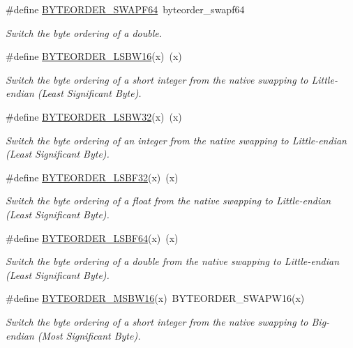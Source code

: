 \begin{DoxyCompactItemize}
\#define \hyperlink{group__byteorder_ga9e36111d85cc708026b869111af4d084}{BYTEORDER\_\-SWAPF64}~byteorder\_\-swapf64
\begin{DoxyCompactList}\small\item\em Switch the byte ordering of a double. \item\end{DoxyCompactList}\item 
\#define \hyperlink{group__byteorder_gaa46359f7d1f29bab74afddacd9decdeb}{BYTEORDER\_\-LSBW16}(x)~(x)
\begin{DoxyCompactList}\small\item\em Switch the byte ordering of a short integer from the native swapping to Little-\/endian (Least Significant Byte). \item\end{DoxyCompactList}\item 
\#define \hyperlink{group__byteorder_ga24bb3ddfe733a3202d53a0d14f186105}{BYTEORDER\_\-LSBW32}(x)~(x)
\begin{DoxyCompactList}\small\item\em Switch the byte ordering of an integer from the native swapping to Little-\/endian (Least Significant Byte). \item\end{DoxyCompactList}\item 
\#define \hyperlink{group__byteorder_gae8ff7d2f1611389be2d908c8675e344a}{BYTEORDER\_\-LSBF32}(x)~(x)
\begin{DoxyCompactList}\small\item\em Switch the byte ordering of a float from the native swapping to Little-\/endian (Least Significant Byte). \item\end{DoxyCompactList}\item 
\#define \hyperlink{group__byteorder_ga8fe695baca4e41252ee2017b3f2e5068}{BYTEORDER\_\-LSBF64}(x)~(x)
\begin{DoxyCompactList}\small\item\em Switch the byte ordering of a double from the native swapping to Little-\/endian (Least Significant Byte). \item\end{DoxyCompactList}\item 
\#define \hyperlink{group__byteorder_gaa99b101c1a15ccb9bf5d070aea1b23c8}{BYTEORDER\_\-MSBW16}(x)~BYTEORDER\_\-SWAPW16(x)
\begin{DoxyCompactList}\small\item\em Switch the byte ordering of a short integer from the native swapping to Big-\/endian (Most Significant Byte). \item\end{DoxyCompactList}\item 

\end{DoxyCompactItemize}
